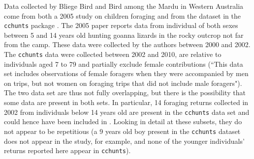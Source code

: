 Data collected by Bliege Bird and Bird among the Mardu in Western Australia come from both a 2005 study on children foraging \citep{bird_mardu_2005} and from the dataset in the \texttt{cchunts} package \citep{koster_life_2020}. The 2005 paper reports data from individual of both sexes between 5 and 14 years old hunting goanna lizards in the rocky outcrop not far from the camp. These data were collected by the authors between 2000 and 2002. The \texttt{cchunts} data were collected between 2002 and 2010, are relative to individuals aged 7 to 79 and partially exclude female contributions (``This data set includes observations of female foragers when they were accompanied by men on trips, but not women on foraging trips that did not include male foragers"). The two data set are thus not fully overlapping, but there is the possibility that some data are present in both sets. In particular, 14 foraging returns collected in 2002 from individuals below 14 years old are present in the \texttt{cchunts} data set and could hence have been included in \citet{bird_mardu_2005}. Looking in detail at these subsets, they do not appear to be repetitious (a 9 years old boy present in the \texttt{cchunts} dataset does not appear in the \citet{bird_mardu_2005} study, for example, and none of the younger individuals' returns reported here appear in \texttt{cchunts}). %

